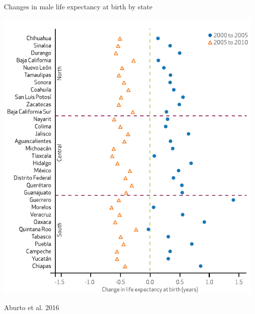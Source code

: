 \documentclass[xcolor={dvipsnames}]{beamer}
\begin{document}
\begin{frame}
	\Large{Changes in male life expectancy at birth by state}


	\begin{center}
		\includegraphics[scale=.66]{Figures/Changes_states_2}
	\end{center}
	
	\tiny{Aburto et al. 2016}				
\end{frame}
\end{document}
